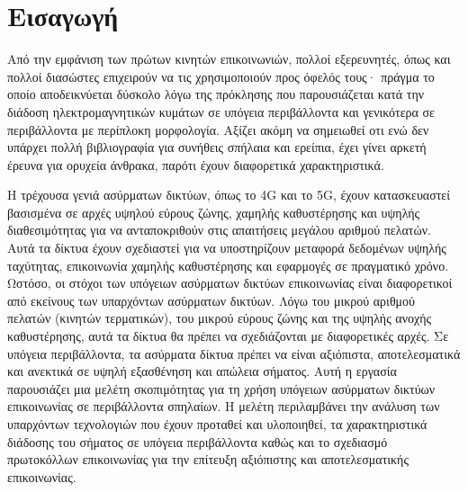 \section{\textsf{Εισαγωγή}}
    Από την εμφάνιση των πρώτων κινητών επικοινωνιών, πολλοί εξερευνητές, όπως και
    πολλοί διασώστες επιχειρούν να τις χρησιμοποιούν προς όφελός τους· πράγμα το οποίο
    αποδεικνύεται δύσκολο λόγω της πρόκλησης που παρουσιάζεται κατά την διάδοση
    ηλεκτρομαγνητικών κυμάτων σε υπόγεια περιβάλλοντα και γενικότερα σε περιβάλλοντα
    με περίπλοκη μορφολογία. Αξίζει ακόμη να σημειωθεί οτι ενώ δεν υπάρχει πολλή
    βιβλιογραφία για συνήθεις σπήλαια και ερείπια, έχει γίνει αρκετή έρευνα για
    ορυχεία άνθρακα, παρότι έχουν διαφορετικά χαρακτηριστικά.

    Η τρέχουσα γενιά ασύρματων δικτύων, όπως το 4G και το 5G, έχουν κατασκευαστεί
    βασισμένα σε αρχές υψηλού εύρους ζώνης, χαμηλής καθυστέρησης και υψηλής
    διαθεσιμότητας για να ανταποκριθούν στις απαιτήσεις μεγάλου αριθμού πελατών. Αυτά
    τα δίκτυα έχουν σχεδιαστεί για να υποστηρίζουν μεταφορά δεδομένων υψηλής
    ταχύτητας, επικοινωνία χαμηλής καθυστέρησης και εφαρμογές σε πραγματικό χρόνο.
    Ωστόσο, οι στόχοι των υπόγειων ασύρματων δικτύων επικοινωνίας είναι διαφορετικοί
    από εκείνους των υπαρχόντων ασύρματων δικτύων. Λόγω του μικρού αριθμού πελατών
    (κινητών τερματικών), του μικρού εύρους ζώνης και της υψηλής ανοχής καθυστέρησης,
    αυτά τα δίκτυα θα πρέπει να σχεδιάζονται με διαφορετικές αρχές. Σε
    υπόγεια περιβάλλοντα, τα ασύρματα δίκτυα πρέπει να είναι αξιόπιστα, αποτελεσματικά
    και ανεκτικά σε υψηλή εξασθένηση και απώλεια σήματος.
    Αυτή η εργασία παρουσιάζει μια μελέτη σκοπιμότητας για τη χρήση υπόγειων ασύρματων
    δικτύων επικοινωνίας σε περιβάλλοντα σπηλαίων. Η μελέτη περιλαμβάνει την ανάλυση
    των υπαρχόντων τεχνολογιών που έχουν προταθεί και υλοποιηθεί, τα χαρακτηριστικά
    διάδοσης του σήματος σε υπόγεια περιβάλλοντα καθώς και το σχεδιασμό πρωτοκόλλων
    επικοινωνίας για την επίτευξη αξιόπιστης και αποτελεσματικής επικοινωνίας.

